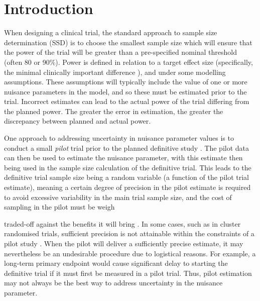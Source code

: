 \documentclass[sagev, Crown]{sagej}
\begin{document}

\maketitle


\section{Introduction}\label{sec:intro}

When designing a clinical trial, the standard approach to sample size determination (SSD) is to choose the smallest sample size which will ensure that the power of the trial will be greater than a pre-specified nominal threshold (often 80 or 90\%). Power is defined in relation to a target effect size (specifically, the minimal clinically important difference \cite{Cook2018}), and under some modelling assumptions. These assumptions will typically include the value of one or more nuisance parameters in the model, and so these must be estimated prior to the trial. Incorrect estimates can lead to the actual power of the trial differing from the planned power. The greater the error in estimation, the greater the discrepancy between planned and actual power.

One approach to addressing uncertainty in nuisance parameter values is to conduct a small \emph{pilot} trial prior to the planned definitive study \cite{Browne1995, Gould2001, Friede2006}. The pilot data can then be used to estimate the nuisance parameter, with this estimate then being used in the sample size calculation of the definitive trial. This leads to the definitive trial sample size being a random variable (a function of the pilot trial estimate),  meaning a certain degree of precision in the pilot estimate is required to avoid excessive variability in the main trial sample size, and the cost of sampling in the pilot must be weigh

traded-off against the benefits it will bring \cite{Teare2014, Whitehead2015}. In some cases, such as in cluster randomised trials, sufficient precision is not attainable within the constraints of a pilot study \cite{Lake2002, Eldridge2015}. When the pilot will deliver a sufficiently  precise estimate, it may nevertheless be an undesirable procedure due to logistical reasons. For example, a long-term primary endpoint would cause significant delay to starting the definitive trial if it must first be measured in a pilot trial. Thus, pilot estimation may not always be the best way to address uncertainty in the nuisance parameter.
\end{document}
